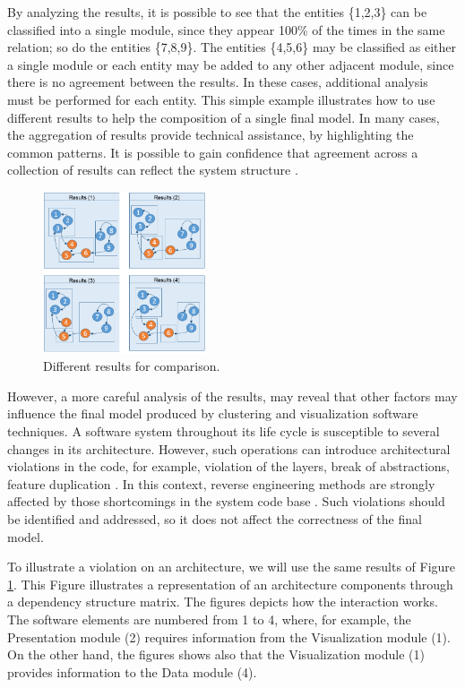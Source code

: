 \documentclass{sig-alternate-05-2015}
\begin{document}
By analyzing the results, it is possible to see that the entities \{1,2,3\} can be classified into a single module, since they appear 100\% of the times in the same relation; so do the entities \{7,8,9\}. The entities \{4,5,6\} may be classified as either a single module or each entity may be added to any other adjacent module, since there is no agreement between the results. In these cases, additional analysis must be performed for each entity. This simple example illustrates how to use different results to help the composition of a single final model. In many cases, the aggregation of results provide technical assistance, by highlighting the common patterns. It is possible to gain confidence that agreement across a collection of results can reflect the system structure \cite {craft}.

\begin{figure}[!h]
	\centering
	\includegraphics[width=0.43\textwidth]{exemplo_comparacao_modelos_en}
	\caption{Different results for comparison.}
	\label{exemplo_comparacao_modelos}
\end{figure}


However, a more careful analysis of the results, may reveal that other factors may influence the final model produced by clustering and visualization software techniques. A software system throughout its life cycle is susceptible to several changes in its architecture. However, such operations can introduce architectural violations in the code, for example, violation of the layers,  break of abstractions, feature duplication \cite {kazman_view_1998}. In this context, reverse engineering methods are strongly affected by those shortcomings in the system code base \cite {Platenius_2012}.  Such violations should be identified and addressed, so it does not affect the correctness of the final model.

To illustrate a violation on an architecture,  we will use the same results of Figure \ref{exemplo_comparacao_modelos}.  This Figure illustrates a representation of an architecture components through a dependency structure matrix. The figures depicts how the interaction works. The software elements are numbered from 1 to 4, where, for example, the Presentation module (2) requires information from the Visualization module (1). On the other hand, the figures shows also that the Visualization module (1) provides information to the Data module (4).
\end{document}
